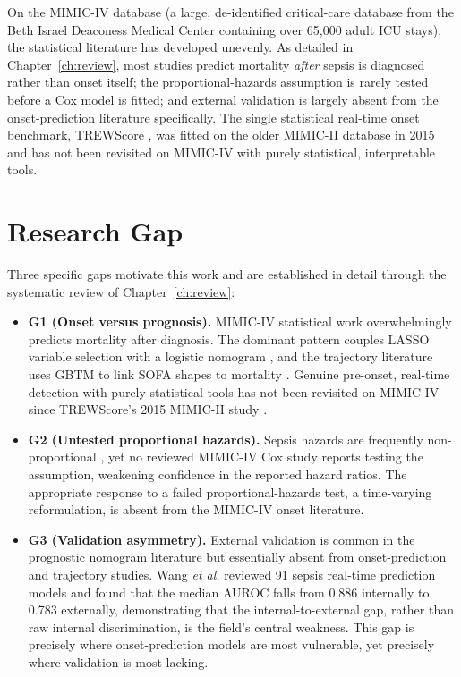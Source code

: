 On the MIMIC-IV database \cite{johnson2023mimiciv} (a large, de-identified
critical-care database from the Beth Israel Deaconess Medical Center
containing over 65{,}000 adult ICU stays), the statistical literature has
developed unevenly. As detailed in Chapter~\ref{ch:review}, most studies
predict mortality \emph{after} sepsis is diagnosed rather than onset itself;
the proportional-hazards assumption is rarely tested before a Cox model is
fitted; and external validation is largely absent from the onset-prediction
literature specifically. The single statistical real-time onset benchmark,
TREWScore \cite{henry2015trewscore}, was fitted on the older MIMIC-II database
in 2015 and has not been revisited on MIMIC-IV with purely statistical,
interpretable tools.

\section{Research Gap}
\label{sec:gap}
Three specific gaps motivate this work and are established in detail through
the systematic review of Chapter~\ref{ch:review}:

\begin{itemize}
  \item \textbf{G1 (Onset versus prognosis).} MIMIC-IV statistical work
  overwhelmingly predicts mortality after diagnosis. The dominant pattern
  couples LASSO variable selection with a logistic nomogram
  \cite{yuan2023nomogram}, and the trajectory literature uses GBTM to link SOFA
  shapes to mortality \cite{yang2022gbtm}. Genuine pre-onset, real-time
  detection with purely statistical tools has not been revisited on MIMIC-IV
  since TREWScore's 2015 MIMIC-II study \cite{henry2015trewscore}.

  \item \textbf{G2 (Untested proportional hazards).} Sepsis hazards are
  frequently non-proportional \cite{kasal2004cox}, yet no reviewed MIMIC-IV Cox
  study reports testing the assumption, weakening confidence in the reported
  hazard ratios. The appropriate response to a failed proportional-hazards
  test, a time-varying reformulation, is absent from the MIMIC-IV onset
  literature.

  \item \textbf{G3 (Validation asymmetry).} External validation is common in the
  prognostic nomogram literature but essentially absent from onset-prediction
  and trajectory studies. Wang \emph{et al.} \cite{wang2025srpm} reviewed 91
  sepsis real-time prediction models and found that the median AUROC falls from
  0.886 internally to 0.783 externally, demonstrating that the
  internal-to-external gap, rather than raw internal discrimination, is the
  field's central weakness. This gap is precisely where onset-prediction models
  are most vulnerable, yet precisely where validation is most lacking.
\end{itemize}

